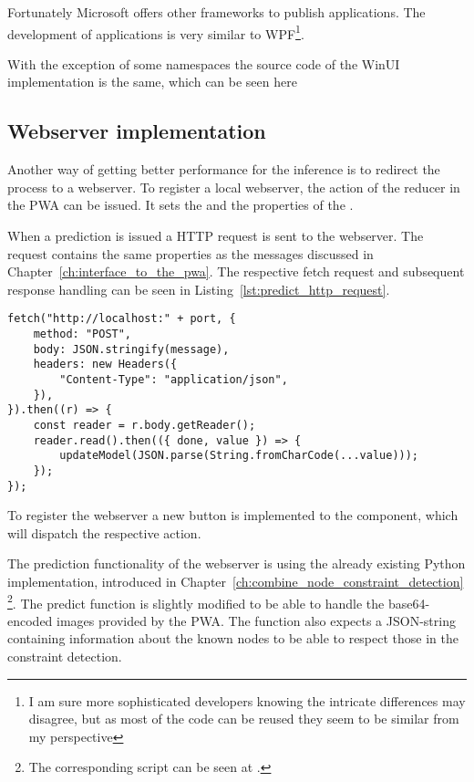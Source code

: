Fortunately Microsoft offers other frameworks to publish applications.
The development of  applications is very similar to WPF\footnote{I am sure more sophisticated developers knowing the intricate differences may disagree, but as most of the code can be reused they seem to be similar from my perspective}.

With the exception of some namespaces the source code of the WinUI implementation is the same, which can be seen here 

\subsection{Webserver implementation}

Another way of getting better performance for the inference is to redirect the process to a webserver.
To register a local webserver, the  action of the  reducer in the PWA can be issued.
It sets the  and the  properties of the .

When a prediction is issued a HTTP request is sent to the webserver.
The request  contains the same properties as the messages discussed in Chapter~\ref{ch:interface_to_the_pwa}.
The respective fetch request and subsequent response handling can be seen in Listing~\ref{lst:predict_http_request}.

\begin{lstlisting}[label={lst:predict_http_request}, caption={Communication of PWA via HTTP.}]
fetch("http://localhost:" + port, {
    method: "POST",
    body: JSON.stringify(message),
    headers: new Headers({
        "Content-Type": "application/json",
    }),
}).then((r) => {
    const reader = r.body.getReader();
    reader.read().then(({ done, value }) => {
        updateModel(JSON.parse(String.fromCharCode(...value)));
    });
});
\end{lstlisting}

To register the webserver a new button is implemented to the  component, which will dispatch the respective  action. 

The prediction functionality of the webserver is using the already existing Python implementation, introduced in Chapter~\ref{ch:combine_node_constraint_detection}
\footnote{The corresponding script can be seen at .}.
The predict function is slightly modified to be able to handle the base64-encoded images provided by the PWA.
The function also expects a JSON-string containing information about the known nodes to be able to respect those in the constraint detection.

